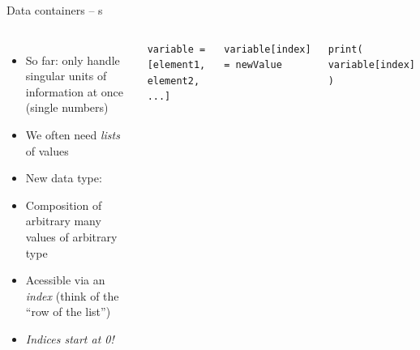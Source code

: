 
\begin{frame}[fragile]{Data containers -- s}
%
\begin{columns}
\begin{itemize}
\item So far: only handle singular units of information at once (single numbers)
\item We often need \emph{lists} of values
\item New data type: 
\item Composition of arbitrary many values of arbitrary type
\item Acessible via an \emph{index} (think of the \enquote{row of the list})
\item \emph{Indices start at 0!}
\end{itemize}
%
\begin{codebox}
\begin{verbatim}
variable = [element1, element2, ...]
\end{verbatim}
\end{codebox}
%
\begin{codebox}
\begin{verbatim}
variable[index] = newValue
\end{verbatim}
\end{codebox}
%
\begin{codebox}
\begin{verbatim}
print( variable[index] )
\end{verbatim}
\end{codebox}
\end{columns}
%
\end{frame}


